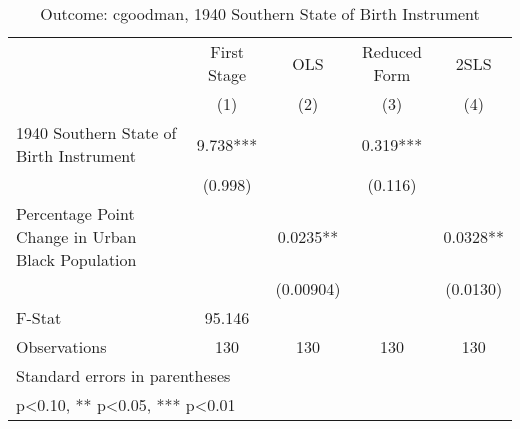 \begin{table}[htbp]\centering
\def\sym#1{\ifmmode^{#1}\else\(^{#1}\)\fi}
\caption{Outcome: cgoodman, 1940 Southern State of Birth Instrument}
\begin{tabular}{l*{4}{c}}
\toprule
                    & First Stage   &         OLS   &Reduced Form   &        2SLS   \\
                    &\multicolumn{1}{c}{(1)}   &\multicolumn{1}{c}{(2)}   &\multicolumn{1}{c}{(3)}   &\multicolumn{1}{c}{(4)}   \\
\midrule
1940 Southern State of Birth Instrument&       9.738***&               &       0.319***&               \\
                    &     (0.998)   &               &     (0.116)   &               \\
\addlinespace
Percentage Point Change in Urban Black Population&               &      0.0235** &               &      0.0328** \\
                    &               &   (0.00904)   &               &    (0.0130)   \\
\midrule
F-Stat              &      95.146   &               &               &               \\
Observations        &         130   &         130   &         130   &         130   \\
\bottomrule
\multicolumn{5}{l}{\footnotesize Standard errors in parentheses}\\
\multicolumn{5}{l}{\footnotesize * p<0.10, ** p<0.05, *** p<0.01}\\
\end{tabular}
\end{table}
